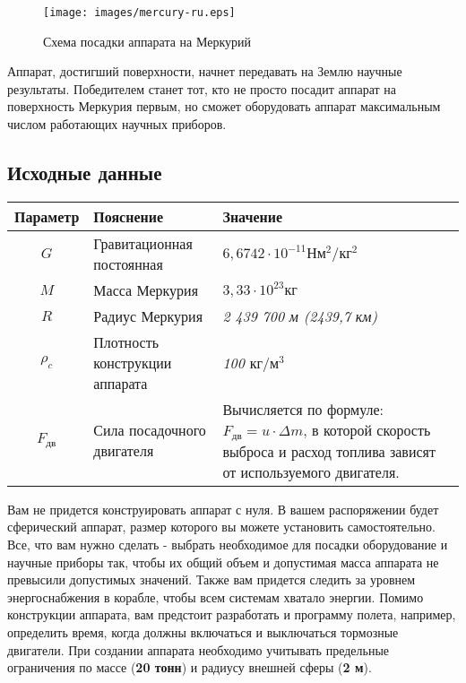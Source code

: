 \documentclass[12pt,a4paper]{article}
\begin{document}
\begin{figure}[tbh]
  \begin{center}
    \texttt{[image: images/mercury-ru.eps]}
    \caption{Схема посадки аппарата на Меркурий}
    \label{Pic:mercury}
  \end{center}
\end{figure}

Аппарат, достигший поверхности, начнет передавать на Землю научные результаты. Победителем
станет тот, кто не просто посадит аппарат на поверхность Меркурия первым, но сможет
оборудовать аппарат максимальным числом работающих научных приборов.

\subsection{Исходные данные}

\begin{center}
\begin{tabular}{ |c|p{6.5cm}|p{6cm}| } 
  \hline
  \textbf{Параметр} & \textbf{Пояснение} & \textbf{Значение} \\
  \hline
  $ G $ & Гравитационная постоянная & $ 6,6742 \cdot 10^{-11} \text{Н} \text{м}^{2}/\text{кг}^{2} $ \\
  \hline
  $ M $ & Масса Меркурия & $3,33 \cdot 10^{23} \text{кг}$ \\
  \hline
  $ R $ & Радиус Меркурия & \emph{2 439 700 м (2439,7 км)} \\
  \hline
  $ \rho_c $ & Плотность конструкции аппарата & \emph{100 $\text{кг}/\text{м}^3$} \\
  \hline
  $ F_{\text{дв}} $ & Сила посадочного двигателя &
  Вычисляется по формуле: $ F_{\text{дв}} = u \cdot \Delta m$, в которой скорость выброса
  и расход топлива зависят от используемого двигателя.\\
  \hline
\end{tabular}
\end{center}

Вам не придется конструировать аппарат с нуля. В вашем распоряжении будет сферический
аппарат, размер которого вы можете установить самостоятельно. Все, что вам нужно сделать -
выбрать необходимое для посадки оборудование и научные приборы так, чтобы их общий объем и
допустимая масса аппарата не превысили допустимых значений. Также вам придется следить за
уровнем энергоснабжения в корабле, чтобы всем системам хватало энергии. Помимо конструкции
аппарата, вам предстоит разработать и программу полета, например, определить время, когда
должны включаться и выключаться тормозные двигатели. При создании аппарата необходимо
учитывать предельные ограничения по массе (\textbf{20 тонн}) и радиусу внешней сферы
(\textbf{2 м}).
\end{document}
